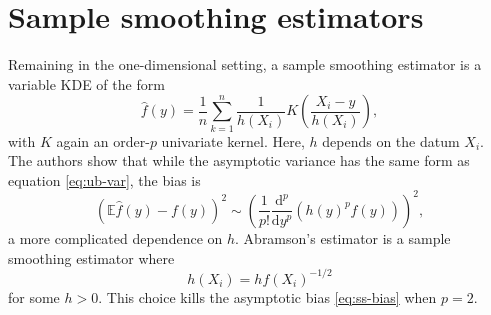 \documentclass{article}
\newcommand{\E}{\mathbb{E}}
\begin{document}
\section{Sample smoothing estimators}
Remaining in the one-dimensional setting, a sample smoothing estimator is a variable KDE of the form 
\begin{equation}\label{eq:ss1}
    \hat{f}(y) = \frac{1}{n} \sum_{k=1}^n \frac{1}{h(X_i)}K\left(\frac{X_i-y}{h(X_i)}\right), 
\end{equation}
with $K$ again an order-$p$ univariate kernel. Here, $h$ depends on the datum $X_i$. The authors show that while the asymptotic variance has the same form as equation \eqref{eq:ub-var}, the bias is 
\begin{equation}\label{eq:ss-bias}
    \left(\E \hat{f}(y) - f(y)\right)^2 \sim \left( \frac{1}{p!} \frac{\text{d}^p}{\text{d}y^p} \left(h(y)^pf(y)\right) \right)^2, 
\end{equation}
a more complicated dependence on $h$. Abramson's estimator is a sample smoothing estimator where 
\begin{equation}\label{eq:abr}
    h(X_i) = hf(X_i)^{-1/2}
\end{equation}
for some $h>0$. This choice kills the asymptotic bias \eqref{eq:ss-bias} when $p=2$. 
\end{document}
